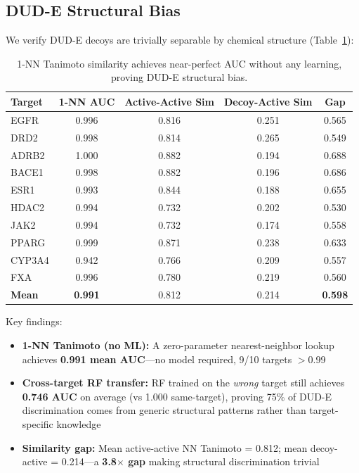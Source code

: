\documentclass[sigconf]{acmart}
\begin{document}
\subsection{DUD-E Structural Bias}

We verify DUD-E decoys are trivially separable by chemical structure (Table~\ref{tab:dude_bias}):

\begin{table}[h]
\caption{1-NN Tanimoto similarity achieves near-perfect AUC without any learning, proving DUD-E structural bias.}
\label{tab:dude_bias}
\centering
\small
\begin{tabular}{@{}lcccc@{}}
\toprule
Target & 1-NN AUC & Active-Active Sim & Decoy-Active Sim & Gap \\
\midrule
EGFR & 0.996 & 0.816 & 0.251 & 0.565 \\
DRD2 & 0.998 & 0.814 & 0.265 & 0.549 \\
ADRB2 & 1.000 & 0.882 & 0.194 & 0.688 \\
BACE1 & 0.998 & 0.882 & 0.196 & 0.686 \\
ESR1 & 0.993 & 0.844 & 0.188 & 0.655 \\
HDAC2 & 0.994 & 0.732 & 0.202 & 0.530 \\
JAK2 & 0.994 & 0.732 & 0.174 & 0.558 \\
PPARG & 0.999 & 0.871 & 0.238 & 0.633 \\
CYP3A4 & 0.942 & 0.766 & 0.209 & 0.557 \\
FXA & 0.996 & 0.780 & 0.219 & 0.560 \\
\midrule
\textbf{Mean} & \textbf{0.991} & 0.812 & 0.214 & \textbf{0.598} \\
\bottomrule
\end{tabular}
\end{table}

Key findings:
\begin{itemize}[noitemsep,topsep=0pt]
\item \textbf{1-NN Tanimoto (no ML):} A zero-parameter nearest-neighbor lookup achieves \textbf{0.991 mean AUC}---no model required, 9/10 targets $>$0.99
\item \textbf{Cross-target RF transfer:} RF trained on the \textit{wrong} target still achieves \textbf{0.746 AUC} on average (vs 1.000 same-target), proving 75\% of DUD-E discrimination comes from generic structural patterns rather than target-specific knowledge
\item \textbf{Similarity gap:} Mean active-active NN Tanimoto = 0.812; mean decoy-active = 0.214---a \textbf{3.8$\times$ gap} making structural discrimination trivial
\end{itemize}
\end{document}
